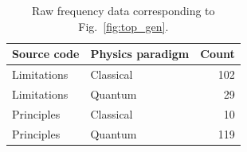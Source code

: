 \documentclass[english,aps,prstper,reprint,showpacs,longbibliography,superscriptaddress,nofootinbib]{revtex4-2}
\begin{document}
\begin{table}[tb] 
  \caption{Raw frequency data corresponding to Fig.~\ref{fig:top_gen}.}
  \label{ta:top_gen}
  \begin{ruledtabular}
    \begin{tabular}{llr}
    Source code & Physics paradigm & Count\\
    \hline
    Limitations & Classical & 102\\
    Limitations & Quantum & 29\\
    Principles & Classical & 10 \\
    Principles & Quantum & 119\\
    \end{tabular}
  \end{ruledtabular}
\end{table}

 
\end{document}
